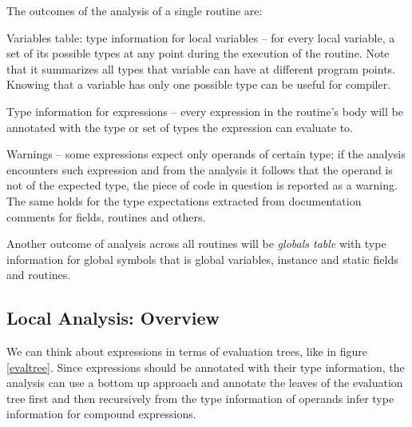         The outcomes of the analysis of a single routine are:
        
        \begin{description*}
            \item[Variables table: type information for local variables] -- 
            for every local variable, a set of its possible types at any 
            point during the execution of the routine. Note that it summarizes 
            all types that variable can have at different program points. 
            Knowing that a variable has only one possible type can be useful 
            for compiler.
            
            \item[Type information for expressions] -- every expression in the 
            routine's body will be annotated with the type or set of types 
            the expression can evaluate to.
            
            \item[Warnings] -- some expressions expect only operands of 
            certain type; if the analysis encounters such expression 
            and from the analysis it follows that the operand is not of the 
            expected type, the piece of code in question is reported as a warning.
            The same holds for the type expectations extracted from 
            documentation comments for fields, routines and others.
            
        \end{description*}
        
        Another outcome of analysis across all routines will be \emph{globals table} 
        with type information for global symbols that is global variables, 
        instance and static fields and routines.
        
        \subsection{Local Analysis: Overview}
        
        We can think about expressions in terms of 
        evaluation trees, like in figure \ref{evaltree}. 
        Since expressions should be annotated with their 
        type information, the analysis can use a bottom 
        up approach and annotate the leaves of the 
        evaluation tree first and then recursively from 
        the type information of operands infer type 
        information for compound expressions.
        
